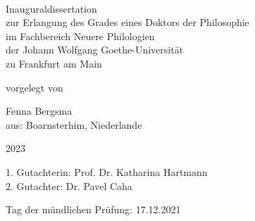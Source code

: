\documentclass[hidelinks,a4paper,twoside,openright,12pt]{memoir}
\begin{document}

\frontmatter

\begin{titlingpage}

\phantom{xx}

\newpage

\center
\large

\phantom{xx}

\vspace{3em}

{\LARGE
{}}\\

\vspace{5em}

Inauguraldissertation\\
zur Erlangung des Grades eines Doktors der Philosophie\\
im Fachbereich Neuere Philologien\\
der Johann Wolfgang Goethe-Universität\\
zu Frankfurt am Main\\

\vspace{5em}

vorgelegt von\\

\vspace{2em}

Fenna Bergsma\\
aus: Boarnsterhim, Niederlande\\

\vspace{3em}

2023\\

\vspace{1em}

1. Gutachterin: Prof. Dr. Katharina Hartmann\\
2. Gutachter: Dr. Pavel Caha\\

\vspace{1em}

Tag der mündlichen Prüfung: 17.12.2021


\end{titlingpage}


\clearpage

\phantom{x}
\vspace{-7em}
\tableofcontents
\clearpage
\end{document}
